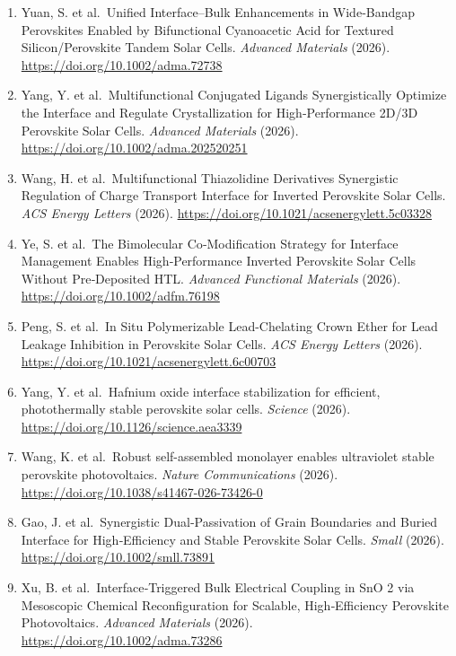 \documentclass[
  11pt,
]{article}
\begin{document}
\begin{enumerate}
  Derivatives for Wide‐Bandgap Perovskite Solar Cells and Tandem
  Devices. \emph{Small} (2026). \url{https://doi.org/10.1002/smll.73595}
\item
  Yuan, S. et al.~Unified Interface--Bulk Enhancements in Wide‐Bandgap
  Perovskites Enabled by Bifunctional Cyanoacetic Acid for Textured
  Silicon/Perovskite Tandem Solar Cells. \emph{Advanced Materials}
  (2026). \url{https://doi.org/10.1002/adma.72738}
\item
  Yang, Y. et al.~Multifunctional Conjugated Ligands Synergistically
  Optimize the Interface and Regulate Crystallization for
  High‐Performance 2D/3D Perovskite Solar Cells. \emph{Advanced
  Materials} (2026). \url{https://doi.org/10.1002/adma.202520251}
\item
  Wang, H. et al.~Multifunctional Thiazolidine Derivatives Synergistic
  Regulation of Charge Transport Interface for Inverted Perovskite Solar
  Cells. \emph{ACS Energy Letters} (2026).
  \url{https://doi.org/10.1021/acsenergylett.5c03328}
\item
  Ye, S. et al.~The Bimolecular Co‐Modification Strategy for Interface
  Management Enables High‐Performance Inverted Perovskite Solar Cells
  Without Pre‐Deposited HTL. \emph{Advanced Functional Materials}
  (2026). \url{https://doi.org/10.1002/adfm.76198}
\item
  Peng, S. et al.~In Situ Polymerizable Lead-Chelating Crown Ether for
  Lead Leakage Inhibition in Perovskite Solar Cells. \emph{ACS Energy
  Letters} (2026). \url{https://doi.org/10.1021/acsenergylett.6c00703}
\item
  Yang, Y. et al.~Hafnium oxide interface stabilization for efficient,
  photothermally stable perovskite solar cells. \emph{Science} (2026).
  \url{https://doi.org/10.1126/science.aea3339}
\item
  Wang, K. et al.~Robust self-assembled monolayer enables ultraviolet
  stable perovskite photovoltaics. \emph{Nature Communications} (2026).
  \url{https://doi.org/10.1038/s41467-026-73426-0}
\item
  Gao, J. et al.~Synergistic Dual‐Passivation of Grain Boundaries and
  Buried Interface for High‐Efficiency and Stable Perovskite Solar
  Cells. \emph{Small} (2026). \url{https://doi.org/10.1002/smll.73891}
\item
  Xu, B. et al.~Interface‐Triggered Bulk Electrical Coupling in SnO 2
  via Mesoscopic Chemical Reconfiguration for Scalable, High‐Efficiency
  Perovskite Photovoltaics. \emph{Advanced Materials} (2026).
  \url{https://doi.org/10.1002/adma.73286}

\end{enumerate}
\end{document}
